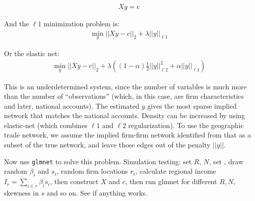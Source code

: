 \documentclass[12pt]{article}
\begin{document}
\begin{gather}
X y = c
\end{gather}


And the $\ell 1$ minimization problem is:
\begin{gather}
\min_y || X y - c||_2 + \lambda || y ||_{\ell 1}
\end{gather}

Or the elastic net:
\begin{gather}
\min_y || X y - c||_2 + \lambda \left( (1-\alpha) \frac{1}{2} || y ||^2_{\ell 2} + \alpha || y ||_{\ell 1} \right)
\end{gather}


This is an underdetermined system, since the number of variables is much more than the number of ``observations'' (which, in this case, are firm characteristics and later, national accounts). The estimated $y$ gives the most sparse implied network that matches the national accounts. Density can be increased by using elastic-net (which combines $\ell 1$ and $\ell 2$ regularization).  To use the geographic trade network, we assume the implied firm-firm network identified from that as a subset of the true network, and leave those edges out of the penalty $||y||$.

Now use \texttt{glmnet} to solve this problem. Simulation testing: set $R$, $N$, set , draw random $\beta_i$ and $s_i$, random firm locations $r_i$, calculate regional income $I_r = \sum_{i \in r} \beta_i s_i$, then construct $X$ and $c$, then run glmnet for different $R,N$, skewness in $s$ and so on. See if anything works.
\end{document}
